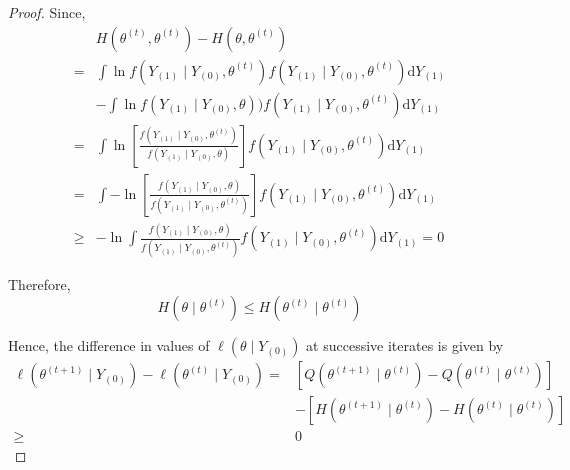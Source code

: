 \begin{proof}
    Since,
    \begin{equation}
        \begin{aligned}
                 & H\left(\theta^{(t)},\theta^{(t)}\right)-H\left(\theta,\theta^{(t)}\right)                                                                                                           \\
            =    & \int\ln f\left(Y_{(1)}\mid Y_{(0)},\theta^{(t)}\right)f\left(Y_{(1)}\mid Y_{(0)},\theta^{(t)}\right)\mathrm{d}Y_{(1)}                                                               \\
                 & -\int\ln f\left(Y_{(1)}\mid Y_{(0)},\theta\right))f\left(Y_{(1)}\mid Y_{(0)},\theta^{(t)}\right)\mathrm{d}Y_{(1)}                                                                   \\
            =    & \int\ln\left[\frac{f\left(Y_{(1)}\mid Y_{(0)},\theta^{(t)}\right)}{f\left(Y_{(1)}\mid Y_{(0)},\theta\right)}\right]f\left(Y_{(1)}\mid Y_{(0)},\theta^{(t)}\right)\mathrm{d}Y_{(1)}  \\
            =    & \int-\ln\left[\frac{f\left(Y_{(1)}\mid Y_{(0)},\theta\right)}{f\left(Y_{(1)}\mid Y_{(0)},\theta^{(t)}\right)}\right]f\left(Y_{(1)}\mid Y_{(0)},\theta^{(t)}\right)\mathrm{d}Y_{(1)} \\
            \geq & -\ln\int\frac{f\left(Y_{(1)}\mid Y_{(0)},\theta\right)}{f\left(Y_{(1)}\mid Y_{(0)},\theta^{(t)}\right)}f\left(Y_{(1)}\mid Y_{(0)},\theta^{(t)}\right)\mathrm{d}Y_{(1)}=0
        \end{aligned}
    \end{equation}

    Therefore,
    \begin{equation}
        H\left(\theta \mid \theta^{(t)}\right) \leq H\left(\theta^{(t)} \mid \theta^{(t)}\right)
    \end{equation}

    Hence, the difference in values of $\ell\left(\theta \mid Y_{(0)}\right)$ at successive iterates is given by
    \begin{equation}
        \begin{aligned}
            \ell\left(\theta^{(t+1)} \mid Y_{(0)}\right)-\ell\left(\theta^{(t)} \mid Y_{(0)}\right)= & \left[Q\left(\theta^{(t+1)} \mid \theta^{(t)}\right)-Q\left(\theta^{(t)} \mid \theta^{(t)}\right)\right]  \\
                                                                                                     & -\left[H\left(\theta^{(t+1)} \mid \theta^{(t)}\right)-H\left(\theta^{(t)} \mid \theta^{(t)}\right)\right] \\
            \geq                                                                                     & 0
        \end{aligned}
    \end{equation}
\end{proof}

